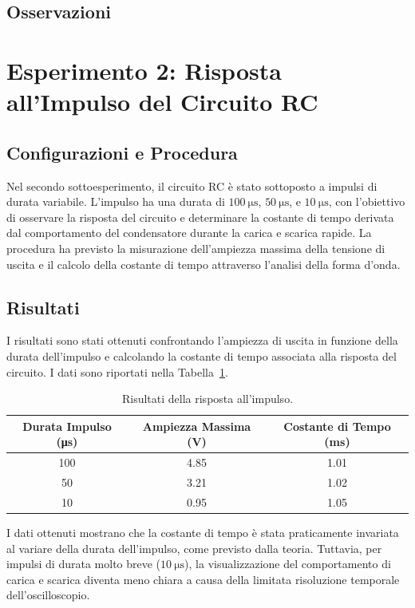 \documentclass[a4paper,12pt]{article}
\begin{document}
\subsection{Osservazioni}


\section{Esperimento 2: Risposta all'Impulso del Circuito RC}
\subsection{Configurazioni e Procedura}
Nel secondo sottoesperimento, il circuito RC è stato sottoposto a impulsi di durata variabile. L'impulso ha una durata di \(\SI{100}{\micro\second}\), \(\SI{50}{\micro\second}\), e \(\SI{10}{\micro\second}\), con l'obiettivo di osservare la risposta del circuito e determinare la costante di tempo derivata dal comportamento del condensatore durante la carica e scarica rapide. La procedura ha previsto la misurazione dell'ampiezza massima della tensione di uscita e il calcolo della costante di tempo attraverso l'analisi della forma d'onda.

\subsection{Risultati}
I risultati sono stati ottenuti confrontando l'ampiezza di uscita in funzione della durata dell'impulso e calcolando la costante di tempo associata alla risposta del circuito. I dati sono riportati nella Tabella~\ref{tab:rc_impulse_response}.

\begin{table}[H]
\centering
\begin{tabular}{|c|c|c|}
\hline
\textbf{Durata Impulso (\si{\micro\second})} & \textbf{Ampiezza Massima (\si{\volt})} & \textbf{Costante di Tempo (\si{\milli\second})} \\ \hline
100 & 4.85 & 1.01 \\ \hline
50 & 3.21 & 1.02 \\ \hline
10 & 0.95 & 1.05 \\ \hline
\end{tabular}
\caption{Risultati della risposta all’impulso.}
\label{tab:rc_impulse_response}
\end{table}

I dati ottenuti mostrano che la costante di tempo è stata praticamente invariata al variare della durata dell'impulso, come previsto dalla teoria. Tuttavia, per impulsi di durata molto breve (\(\SI{10}{\micro\second}\)), la visualizzazione del comportamento di carica e scarica diventa meno chiara a causa della limitata risoluzione temporale dell'oscilloscopio.
\end{document}
